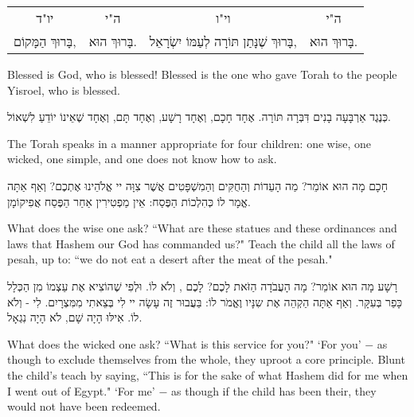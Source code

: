 \vspace{1em}

\begin{tabular}{c c c c}
{\small \instructionfont
יו"ד
} & {\small \instructionfont
ה"י
} & {\small \instructionfont
וי"ו
} & {\small \instructionfont
ה"י 
} \\
בָּרוּךְ הַמָּקוֹם, 
& בָּרוּךְ הוּא. 
& בָּרוּךְ שֶׁנָּתַן תּוֹרָה לְעַמּוֹ יִשְׂרָאֵל, 
& בָּרוּךְ הוּא. \\
\end{tabular}

\begin{english}
Blessed is God, who is blessed! Blessed is the one who gave Torah to the people Yisroel, who is blessed.
\end{english}

\vspace{1em}

כְּנֶגֶד אַרְבָּעָה בָנִים דִּבְּרָה תּוֹרָה. אֶחָד חָכָם, וְאֶחָד רָשָׁע, וְאֶחָד תָּם, וְאֶחָד שֶׁאֵינוֹ יוֹדֵעַ לִשְׁאוֹל.

\begin{english}
The Torah speaks in a manner appropriate for four children: one wise, one wicked, one simple, and one does not know how to ask.
\end{english}

חָכָם מָה הוּא אוֹמֵר? מַה הָעֵדוֹת וְהַחֻקִּים וְהַמִשְׁפָּטִים אֲשֶׁר צִוָּה יי אֱלֹהֵינוּ אֶתְכֶם? וְאַף אַתָּה אֱמָר לוֹ כְּהִלְכוֹת הַפֶּסַח: אֵין מַפְטִירִין אַחַר הַפֶּסַח אֲפִיקוֹמָן.

\begin{english}
What does the wise one ask? ``What are these statues and these ordinances and laws that Hashem our God has commanded us?" Teach the child all the laws of pesah, up to: ``we do not eat a desert after the meat of the pesah."
\end{english}

רָשָׁע מָה הוּא אוֹמֵר? מָה הָעֲבֹדָה הַזֹּאת לָכֶם? לָכֶם , וְלֹא לוֹ. וּלְפִי שֶׁהוֹצִיא אֶת עַצְמוֹ מִן הַכְּלָל כָּפַר בְּעִקָּר. וְאַף אַתָּה הַקְהֵה אֶת שִנָּיו וֶאֱמֹר לוֹ: בַּעֲבוּר זֶה עָשָׂה יי לִי בְּצֵאתִי מִמִּצְרָיִם. לִי - וְלֹא לוֹ. אִילּוּ הָיָה שָׁם, לֹא הָיָה נִגְאָל.

\begin{english}
What does the wicked one ask? ``What is this service for you?" `For you' $-$ as though to exclude themselves from the whole, they uproot a core principle. Blunt the child's teach by saying, ``This is for the sake of what Hashem did for me when I went out of Egypt." `For me' $-$ as though if the child has been their, they would not have been redeemed.
\end{english}

